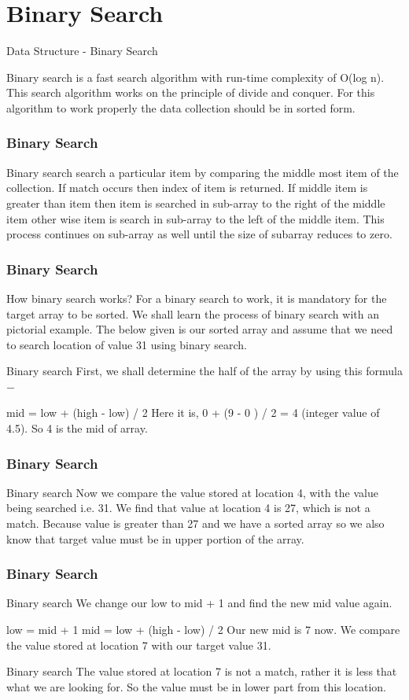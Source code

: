 \documentclass{beamer}
\begin{document}
\section{Binary Search}
\begin{frame}
Data Structure - Binary Search

Binary search is a fast search algorithm with run-time complexity of O(log n). This search algorithm works on the principle of divide and conquer. For this algorithm to work properly the data collection should be in sorted form.
\end{frame}

\begin{frame}
\frametitle{Binary Search}
\large
Binary search search a particular item by comparing the middle most item of the collection. If match occurs then index of item is returned. If middle item is greater than item then item is searched in sub-array to the right of the middle item other wise item is search in sub-array to the left of the middle item. This process continues on sub-array as well until the size of subarray reduces to zero.
\end{frame}

\begin{frame}
\frametitle{Binary Search}
\large
How binary search works?
For a binary search to work, it is mandatory for the target array to be sorted. We shall learn the process of binary search with an pictorial example. The below given is our sorted array and assume that we need to search location of value 31 using binary search.

Binary search
First, we shall determine the half of the array by using this formula −

mid = low + (high - low) / 2
Here it is, 0 + (9 - 0 ) / 2 = 4 (integer value of 4.5). So 4 is the mid of array.
\end{frame}
\begin{frame}
\frametitle{Binary Search}
\large
Binary search
Now we compare the value stored at location 4, with the value being searched i.e. 31. We find that value at location 4 is 27, which is not a match. Because value is greater than 27 and we have a sorted array so we also know that target value must be in upper portion of the array.
\end{frame}
\begin{frame}
\frametitle{Binary Search}
\large
Binary search
We change our low to mid + 1 and find the new mid value again.

low = mid + 1
mid = low + (high - low) / 2
Our new mid is 7 now. We compare the value stored at location 7 with our target value 31.

Binary search
The value stored at location 7 is not a match, rather it is less that what we are looking for. So the value must be in lower part from this location.
\end{frame}
\end{document}
